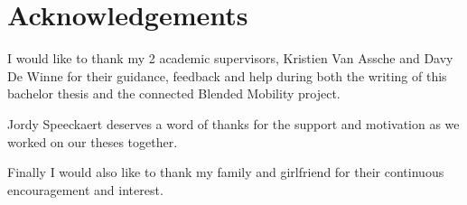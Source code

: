 \chapter*{Acknowledgements}

I would like to thank my 2 academic supervisors, Kristien Van Assche and Davy De Winne for their guidance, feedback and help during both the writing of this bachelor thesis and the connected Blended Mobility project.

Jordy Speeckaert deserves a word of thanks for the support and motivation as we worked on our theses together.

Finally I would also like to thank my family and girlfriend for their continuous encouragement and interest.